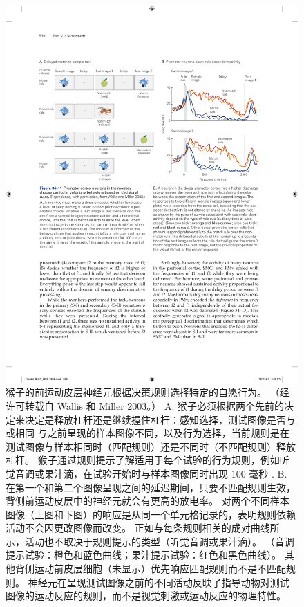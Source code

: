 \begin{figure}[htbp]
	\centering
	\includegraphics[width=0.95\linewidth]{chap34/fig_34_11}
	\caption{猴子的前运动皮层神经元根据决策规则选择特定的自愿行为。 （经许可转载自 Wallis 和 Miller 2003。） A. 猴子必须根据两个先前的决定来决定是释放杠杆还是继续握住杠杆：感知选择，测试图像是否与或相同 与之前呈现的样本图像不同，以及行为选择，当前规则是在测试图像与样本相同时（匹配规则）还是不同时（不匹配规则）释放杠杆。 猴子通过规则提示了解适用于每个试验的行为规则，例如听觉音调或果汁滴，在试验开始时与样本图像同时出现 100 毫秒 . B. 在第一个和第二个图像呈现之间的延迟期间，只要不匹配规则生效，背侧前运动皮层中的神经元就会有更高的放电率。 对两个不同样本图像（上图和下图）的响应是从同一个单元格记录的，表明规则依赖活动不会因更改图像而改变。 正如与每条规则相关的成对曲线所示，活动也不取决于规则提示的类型（听觉音调或果汁滴）。 （音调提示试验：橙色和蓝色曲线；果汁提示试验：红色和黑色曲线）。 其他背侧运动前皮层细胞（未显示）优先响应匹配规则而不是不匹配规则。 神经元在呈现测试图像之前的不同活动反映了指导动物对测试图像的运动反应的规则，而不是视觉刺激或运动反应的物理特性。}
	\label{fig:34_11}
\end{figure}



